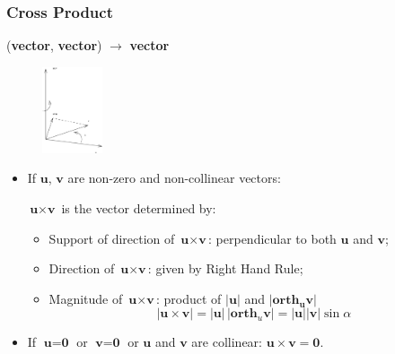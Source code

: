 \begin{frame}
 \frametitle{Cross Product}

\begin{center}
 (\textbf{vector}, \textbf{vector}) $\to$ \textbf{vector}
\end{center}

\begin{figure}[h]
  \includegraphics[height=1in]{../images/ok-cross_product.eps}
\end{figure}

\begin{itemize}
 \item If $\textbf{u}$, $\textbf{v}$ are non-zero and non-collinear vectors:\\
\begin{center}
 $\textbf{u} \times \textbf{v}$ is the vector determined by:
\end{center}
%
\begin{itemize}
 \item Support of direction of $\textbf{u} \times \textbf{v}$:
perpendicular to both $\textbf{u}$ and $\textbf{v}$;
 \item Direction of $\textbf{u} \times \textbf{v}$: given by Right Hand Rule;
 \item Magnitude of $\textbf{u} \times \textbf{v}$: product of $|\textbf{u}|$ and $|\textbf{orth}_{\bm{u}} \textbf{v}|$
%
$$|\textbf{u} \times \textbf{v}| = |\textbf{u}| \, |\textbf{orth}_u \textbf{v}| = |\textbf{u}| |\textbf{v}| \sin{\alpha}$$
%
\end{itemize}
\item If $\textbf{u}=\textbf{0}$ or $\textbf{v}=\textbf{0}$ or
$\textbf{u}$ and $\textbf{v}$ are collinear: \pause $\textbf{u} \times \textbf{v} = \textbf{0} $.
%
\end{itemize}

\end{frame}

